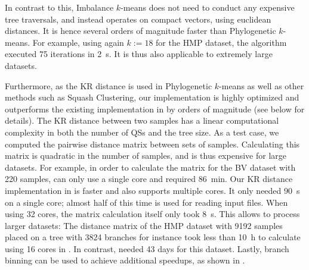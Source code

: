In contrast to this, Imbalance $k$-means does not need to conduct any expensive tree traversals,
and instead operates on compact vectors, using euclidean distances.
It is hence several orders of magnitude faster than Phylogenetic $k$-means.
For example, using again $k:=18$ for the \ac{HMP} dataset,
the algorithm executed \num{75} iterations in \SI{2}{\second}.
It is thus also applicable to extremely large datasets.

Furthermore, as the KR distance is used in Phylogenetic $k$-means as well as other methods such as Squash Clustering,
our implementation is highly optimized and
outperforms the existing implementation in  \cite{Matsen2010} by orders of magnitude (see below for details).
The KR distance between two samples has a linear computational complexity in both the number of \acp{QS} and the tree size.
As a test case, we computed the pairwise distance matrix between sets of samples.
Calculating this matrix is quadratic in the number of samples,
and is thus expensive for large datasets.
For example, in order to calculate the matrix for the \ac{BV} dataset with \num{220} samples,
 can only use a single core and required \SI{86}{\minute}.
Our KR distance implementation in  is faster and also supports multiple cores.
It only needed \SI{90}{\second} on a single core; almost half of this time is used for reading input files.
When using \num{32} cores, the matrix calculation itself only took \SI{8}{\second}.
This allows to process larger datasets:
The distance matrix of the \ac{HMP} dataset with \num{9 192} samples placed on a tree with \num{3 824} branches
for instance took less than \SI{10}{\hour} to calculate using \num{16} cores in .
In contrast,  needed \num{43} days for this dataset.
Lastly, branch binning can be used to achieve additional speedups,
as shown in .


